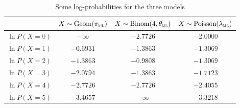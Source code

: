 \documentclass[a4paper,10pt,landscape,twocolumn]{scrartcl}
\begin{document}
\begin{table}
\begin{tabular}{l c c c}
& 	$X \sim \text{Geom}(\pi_\textsc{ml})$
&	$X \sim \text{Binom}(4, \theta_\textsc{ml})$
&	$X \sim \text{Poisson}(\lambda_\textsc{ml})$ \\\hline\hline
$\ln P(X = 0)$ &$-\infty$ &$-2.7726$ &$-2.0000$ \\\hline
$\ln P(X = 1)$ &$-0.6931$ &$-1.3863$ &$-1.3069$ \\\hline
$\ln P(X = 2)$ &$-1.3863$ &$-0.9808$ &$-1.3069$ \\\hline
$\ln P(X = 3)$ &$-2.0794$ &$-1.3863$ &$-1.7123$ \\\hline
$\ln P(X = 4)$ &$-2.7726$ &$-2.7726$ &$-2.4055$ \\\hline
$\ln P(X = 5)$ &$-3.4657$ &$-\infty$ &$-3.3218$ \\\hline
\end{tabular}
\caption{Some log-probabilities for the three models \label{table}}
\end{table}
\end{document}
